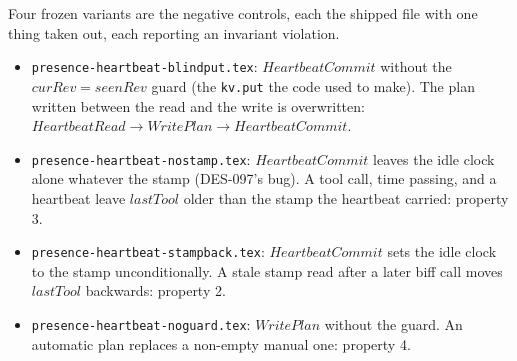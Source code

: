 \documentclass[a4paper,10pt,fleqn]{article}
\begin{document}
Four frozen variants are the negative controls, each the shipped file with one
thing taken out, each reporting an invariant violation.
\begin{itemize}
  \item \texttt{presence-heartbeat-blindput.tex}: $HeartbeatCommit$ without the
    $curRev = seenRev$ guard (the \texttt{kv.put} the code used to make).  The
    plan written between the read and the write is overwritten: $HeartbeatRead
    \to WritePlan \to HeartbeatCommit$.
  \item \texttt{presence-heartbeat-nostamp.tex}: $HeartbeatCommit$ leaves the idle
    clock alone whatever the stamp (DES-097's bug).  A tool call, time passing,
    and a heartbeat leave $lastTool$ older than the stamp the heartbeat carried:
    property 3.
  \item \texttt{presence-heartbeat-stampback.tex}: $HeartbeatCommit$ sets the idle
    clock to the stamp unconditionally.  A stale stamp read after a later
    biff call moves $lastTool$ backwards: property 2.
  \item \texttt{presence-heartbeat-noguard.tex}: $WritePlan$ without the guard.
    An automatic plan replaces a non-empty manual one: property 4.
\end{itemize}

\end{document}
